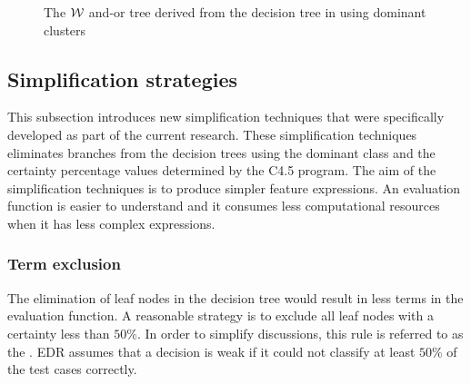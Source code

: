 \begin{figure} [!ht]
\center
\tiny
{}
{

	{
		{
		{
			{
				{
					{
						{
							{}
						}
					}
				}
			}
		}
	}
}
}
\caption{The ${\mathcal W}$ and-or tree derived from the decision tree in  using dominant clusters}
\label{fig:balanced_and-or}
\end{figure}

\subsection{Simplification strategies}
\label{sec:simplify_strategies}
This subsection introduces new simplification techniques that were specifically developed as part of the current research.  These simplification techniques eliminates branches from the decision trees using the dominant class and the certainty percentage values determined by the C4.5 program.  The aim of the simplification techniques is to produce simpler feature expressions.  An evaluation function is easier to understand and it consumes less computational resources when it has less complex expressions.   

\subsubsection{Term exclusion}
The elimination of leaf nodes in the decision tree would result in less terms in the evaluation function.  A reasonable strategy is to exclude all leaf nodes with a certainty less than $50\%$.  In order to simplify discussions, this rule is referred to as the . EDR assumes that a decision is weak if it could not classify at least $50\%$ of the test cases correctly.  

